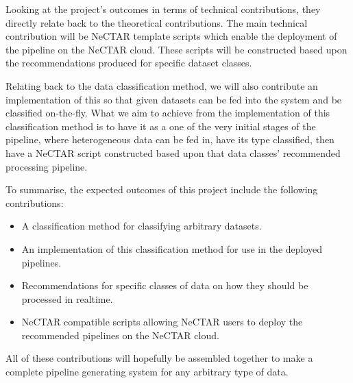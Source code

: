 \documentclass[a4paper,11pt]{article}
\begin{document}
Looking at the project's outcomes in terms of technical contributions, they
directly relate back to the theoretical contributions. The main technical
contribution will be NeCTAR template scripts which enable the deployment of the
pipeline on the NeCTAR cloud. These scripts will be constructed based upon the
recommendations produced for specific dataset classes.

Relating back to the data classification method, we will also contribute an
implementation of this so that given datasets can be fed into the system and be
classified on-the-fly. What we aim to achieve from the implementation of this
classification method is to have it as a one of the very initial stages of the
pipeline, where heterogeneous data can be fed in, have its type classified,
then have a NeCTAR script constructed based upon that data classes' recommended
processing pipeline.

To summarise, the expected outcomes of this project include the following contributions:

\begin{itemize}
  \item A classification method for classifying arbitrary datasets.
  \item An implementation of this classification method for use in the deployed pipelines.
  \item Recommendations for specific classes of data on how they should be processed in realtime.
  \item NeCTAR compatible scripts allowing NeCTAR users to deploy the recommended pipelines on the NeCTAR cloud.
\end{itemize}

All of these contributions will hopefully be assembled together to make a
complete pipeline generating system for any arbitrary type of data.



\newpage



\end{document}
